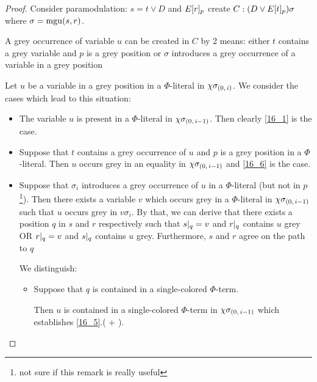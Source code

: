 \documentclass[,%
	draft=false,%
	numbers=noendperiod
	12pt,
	a4paper,
	oneside,%
	openany,
]{memoir}
\newcommand{\inv}{\ensuremath{\chi}}
\begin{document}
\begin{proof}
	Consider paramodulation: $s=t \lor D$ and $E{[r]_{p}}$ create $C: (D\lor E{[t]_{p}})\sigma$ where $\sigma = \operatorname{mgu}(s, r)$.

	A grey occurrence of variable $u$ can be created in $C$ by 2 means:
	either $t$ contains a grey variable and $p$ is a grey position or $\sigma$ introduces a grey occurrence of a variable in a grey position


	Let $u$ be a variable in a grey position in a $\Phi$-literal in $\chi\sigma_{(0,\,i)}$.
	We consider the cases which lead to this situation:


	\begin{itemize}

		\item The variable $u$ is present in a $\Phi$-literal in $\chi\sigma_{(0,\,i-1)}$. Then clearly \ref{16_1} is the case.

		\item Suppose that $t$ contains a grey occurrence of $u$ and $p$ is a grey position in a $\Phi$-literal.
			Then $u$ occurs grey in an equality in $\inv\sigmazmi$ and \ref{16_6} is the case.

		\item Suppose that $\sigma_i$ introduces a grey occurrence of $u$ in a $\Phi$-literal (but not in $p$\footnote{not sure if this remark is really useful}).
				Then there exists a variable $v$ which occurs grey in a $\Phi$-literal in $\chi\sigma_{(0,\,i-1)}$ such that $u$ occurs grey in $v\sigma_i$.
					By that, we can derive that there exists a position $q$ in $s$ and $r$ respectively such that 
					 $s|_{q} = v$ and $r|_{q}$ contains $u$ grey OR 
					$r|_{q} = v$ and $s|_{q}$ contains $u$ grey. Furthermore, $s$ and $r$ agree on the path to $q$

					We distinguish:

					\begin{itemize}
						\item Suppose that $q$ is contained in a single-colored $\Phi$-term.

							Then $u$ is contained in a single-colored $\Phi$-term in $\chi\sigma_{(0,\,i-1)}$ which establishes \ref{16_5}.( + ).


\end{itemize}
\end{itemize}
\end{proof}
\end{document}
